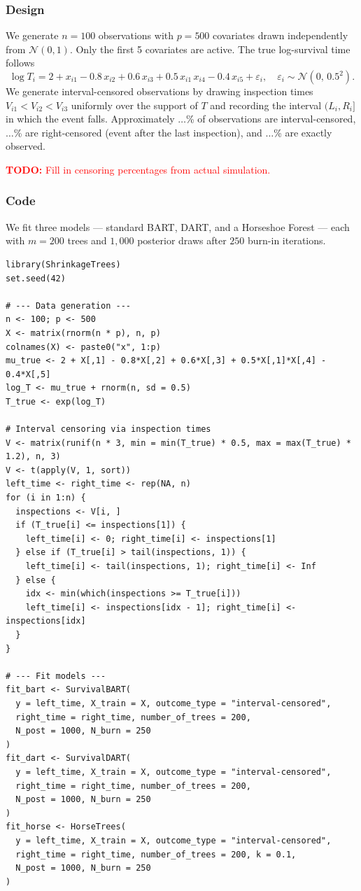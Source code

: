 \subsubsection{Design}\label{design}

We generate \(n = 100\) observations with \(p = 500\) covariates drawn independently from \(\mathcal{N}(0, 1)\). Only the first 5 covariates are active. The true log-survival time follows
\[
\log T_i = 2 + x_{i1} - 0.8\, x_{i2} + 0.6\, x_{i3} + 0.5\, x_{i1}\, x_{i4} - 0.4\, x_{i5} + \varepsilon_i, \quad \varepsilon_i \sim \mathcal{N}(0,\, 0.5^2).
\]
We generate interval-censored observations by drawing inspection times \(V_{i1} < V_{i2} < V_{i3}\) uniformly over the support of \(T\) and recording the interval \((L_i, R_i]\) in which the event falls. Approximately \(\ldots\)\% of observations are interval-censored, \(\ldots\)\% are right-censored (event after the last inspection), and \(\ldots\)\% are exactly observed.

\textcolor{red}{\textbf{TODO:} Fill in censoring percentages from actual simulation.}

\subsubsection{Code}\label{code}

We fit three models --- standard BART, DART, and a Horseshoe Forest --- each with \(m = 200\) trees and \(1{,}000\) posterior draws after \(250\) burn-in iterations.

\begin{verbatim}
library(ShrinkageTrees)
set.seed(42)

# --- Data generation ---
n <- 100; p <- 500
X <- matrix(rnorm(n * p), n, p)
colnames(X) <- paste0("x", 1:p)
mu_true <- 2 + X[,1] - 0.8*X[,2] + 0.6*X[,3] + 0.5*X[,1]*X[,4] - 0.4*X[,5]
log_T <- mu_true + rnorm(n, sd = 0.5)
T_true <- exp(log_T)

# Interval censoring via inspection times
V <- matrix(runif(n * 3, min = min(T_true) * 0.5, max = max(T_true) * 1.2), n, 3)
V <- t(apply(V, 1, sort))
left_time <- right_time <- rep(NA, n)
for (i in 1:n) {
  inspections <- V[i, ]
  if (T_true[i] <= inspections[1]) {
    left_time[i] <- 0; right_time[i] <- inspections[1]
  } else if (T_true[i] > tail(inspections, 1)) {
    left_time[i] <- tail(inspections, 1); right_time[i] <- Inf
  } else {
    idx <- min(which(inspections >= T_true[i]))
    left_time[i] <- inspections[idx - 1]; right_time[i] <- inspections[idx]
  }
}

# --- Fit models ---
fit_bart <- SurvivalBART(
  y = left_time, X_train = X, outcome_type = "interval-censored",
  right_time = right_time, number_of_trees = 200,
  N_post = 1000, N_burn = 250
)
fit_dart <- SurvivalDART(
  y = left_time, X_train = X, outcome_type = "interval-censored",
  right_time = right_time, number_of_trees = 200,
  N_post = 1000, N_burn = 250
)
fit_horse <- HorseTrees(
  y = left_time, X_train = X, outcome_type = "interval-censored",
  right_time = right_time, number_of_trees = 200, k = 0.1,
  N_post = 1000, N_burn = 250
)
\end{verbatim}

